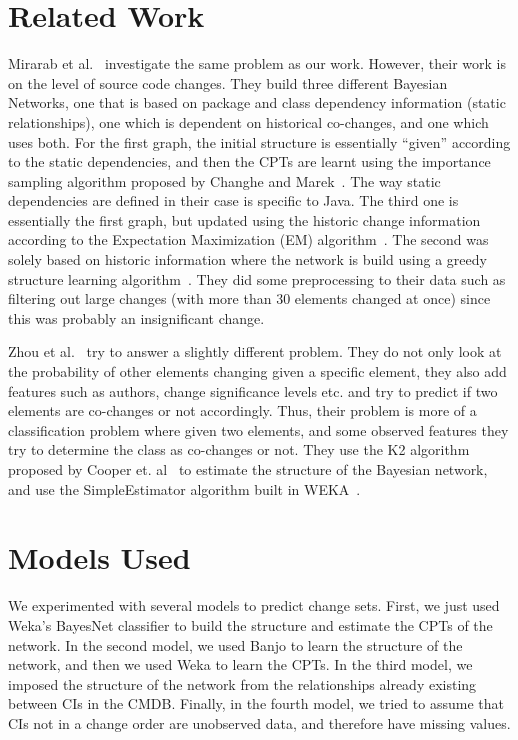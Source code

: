 \documentclass{article}
\begin{document}
\section{Related Work}
\label{rel-work}

Mirarab et al.~\cite{mirarab2007} investigate the same problem as our work. However, their work is on the level of source code changes. They build three
different Bayesian Networks, one that is based on package and class dependency information (static relationships), one which is dependent on historical
co-changes, and one which uses both. For the first graph, the initial structure is essentially ``given'' according to the static dependencies, and then the CPTs
are learnt using the importance sampling algorithm proposed by Changhe and Marek~\cite{yuan2003importance}. The way static dependencies are defined in their
case is specific to Java. The third one is essentially the first graph, but updated using the historic change information according to the Expectation
Maximization (EM) algorithm~\cite{dempster1977maximum}. The second was solely based on historic information where the network is build using a greedy structure
 learning algorithm~\cite{friedman1996learning}. They did some preprocessing to their data such as filtering out large changes (with more than 30 elements
changed at once) since this was probably an insignificant change.

Zhou et al.~\cite{zhou2008} try to answer a slightly different problem. They do not only look at the probability of other elements changing given a specific
element, they also add features such as authors, change significance levels etc. and try to predict if two elements are co-changes or not accordingly. Thus,
their problem is more of a classification problem where given two elements, and some observed features they try to determine the class as co-changes or not.
They use the K2 algorithm proposed by Cooper et. al~\cite{cooper1992bayesian} to estimate the structure of the Bayesian network, and use the SimpleEstimator
algorithm built in WEKA~\cite{witten2005data}.

\section{Models Used}
\label{sec:modelsused}

We experimented with several models to predict change sets. First, we just used Weka's BayesNet classifier to build the structure and estimate the CPTs of
the network. In the second model, we used Banjo to learn the structure of the network, and then we used Weka to learn the CPTs. In the third model, we imposed
the structure of the network from the relationships already existing between CIs in the CMDB. Finally, in the fourth model, we tried to assume that CIs not in
a change order are unobserved data, and therefore have missing values.
\end{document}
